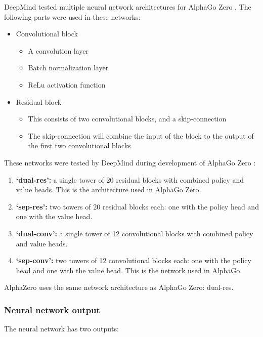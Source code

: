 \documentclass{article}
\begin{document}
DeepMind tested multiple neural network architectures for AlphaGo Zero \cite{NeuralNetworksChessprogramming}. 
The following parts were used in these networks:

\begin{itemize}
    \item Convolutional block
    \begin{itemize}
        \item A convolution layer
        \item Batch normalization layer
        \item ReLu activation function
    \end{itemize}
    \item Residual block
    \begin{itemize}
        \item This consists of two convolutional blocks, and a skip-connection
        \item The skip-connection will combine the input of the block to the output of the first two convolutional blocks
    \end{itemize}
\end{itemize}

These networks were tested by DeepMind during development of AlphaGo Zero \cite{MasteringGameZero}:

\begin{enumerate}
    \item \textbf{`dual-res':} a single tower of 20 residual blocks with combined policy and value heads. This is the architecture used in AlphaGo Zero.
    \item \textbf{`sep-res':} two towers of 20 residual blocks each: one with the policy head and one with the value head.
    \item \textbf{`dual-conv':} a single tower of 12 convolutional blocks with combined policy and value heads.
    \item \textbf{`sep-conv':} two towers of 12 convolutional blocks each: one with the policy head and one with the value head. This is the network used in AlphaGo.
\end{enumerate}

AlphaZero uses the same network architecture as AlphaGo Zero: dual-res.

\subsubsection{Neural network output}

The neural network has two outputs:
\end{document}
